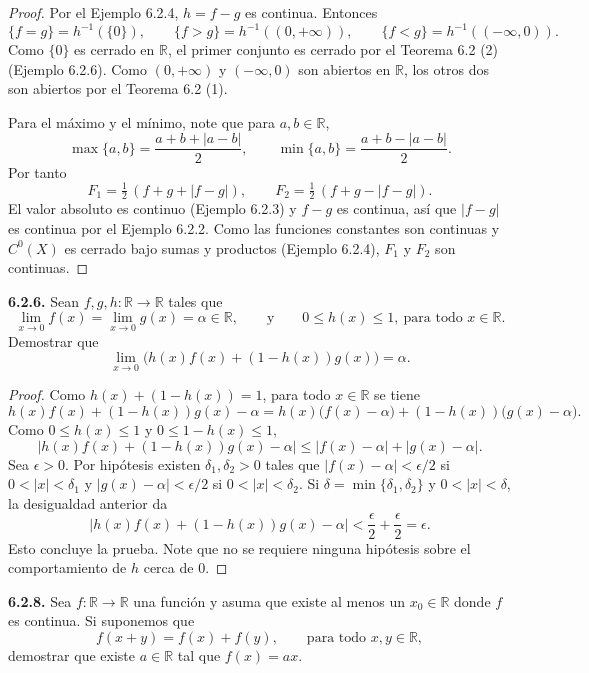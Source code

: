 \documentclass[11pt]{article}
\newcommand{\R}{\mathbb{R}}
\begin{document}
  \begin{proof}
  Por el Ejemplo 6.2.4, $h=f-g$ es continua. Entonces
  \[
  \{f=g\}=h^{-1}(\{0\}),\qquad \{f>g\}=h^{-1}((0,+\infty)),\qquad \{f<g\}=h^{-1}((-\infty,0)).
  \]
  Como $\{0\}$ es cerrado en $\R$, el primer conjunto es cerrado por el Teorema 6.2 (2) (Ejemplo 6.2.6). Como $(0,+\infty)$ y $(-\infty,0)$ son abiertos en $\R$, los otros dos son abiertos por el Teorema 6.2 (1).

  Para el máximo y el mínimo, note que para $a,b\in\R$,
  \[
  \max\{a,b\}=\frac{a+b+|a-b|}{2},\qquad \min\{a,b\}=\frac{a+b-|a-b|}{2}.
  \]
  Por tanto
  \[
  F_1=\tfrac12\,(f+g+|f-g|),\qquad F_2=\tfrac12\,(f+g-|f-g|).
  \]
  El valor absoluto es continuo (Ejemplo 6.2.3) y $f-g$ es continua, así que $|f-g|$ es continua por el Ejemplo 6.2.2. Como las funciones constantes son continuas y $C^0(X)$ es cerrado bajo sumas y productos (Ejemplo 6.2.4), $F_1$ y $F_2$ son continuas.
  \end{proof}

  \textbf{6.2.6.} Sean $f,g,h:\R\to\R$ tales que
  \[
  \lim_{x\to 0}f(x)=\lim_{x\to 0}g(x)=\alpha\in\R,\qquad\text{y}\qquad 0\le h(x)\le 1,\ \text{para todo }x\in\R.
  \]
  Demostrar que
  \[
  \lim_{x\to 0}\big(h(x)f(x)+(1-h(x))g(x)\big)=\alpha.
  \]

  \begin{proof}
  Como $h(x)+(1-h(x))=1$, para todo $x\in\R$ se tiene
  \[
  h(x)f(x)+(1-h(x))g(x)-\alpha=h(x)\big(f(x)-\alpha\big)+(1-h(x))\big(g(x)-\alpha\big).
  \]
  Como $0\le h(x)\le 1$ y $0\le 1-h(x)\le 1$,
  \[
  \big|h(x)f(x)+(1-h(x))g(x)-\alpha\big|\le |f(x)-\alpha|+|g(x)-\alpha|.
  \]
  Sea $\epsilon>0$. Por hipótesis existen $\delta_1,\delta_2>0$ tales que $|f(x)-\alpha|<\epsilon/2$ si $0<|x|<\delta_1$ y $|g(x)-\alpha|<\epsilon/2$ si $0<|x|<\delta_2$. Si $\delta=\min\{\delta_1,\delta_2\}$ y $0<|x|<\delta$, la desigualdad anterior da
  \[
  \big|h(x)f(x)+(1-h(x))g(x)-\alpha\big|<\frac\epsilon2+\frac\epsilon2=\epsilon.
  \]
  Esto concluye la prueba. Note que no se requiere ninguna hipótesis sobre el comportamiento de $h$ cerca de $0$.
  \end{proof}

  \textbf{6.2.8.} Sea $f:\R\to\R$ una función y asuma que existe al menos un $x_0\in\R$ donde $f$ es continua. Si suponemos que
  \[
  f(x+y)=f(x)+f(y),\qquad\text{para todo }x,y\in\R,
  \]
  demostrar que existe $a\in\R$ tal que $f(x)=ax$.
\end{document}
